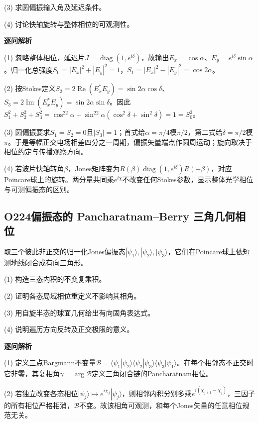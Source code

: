 (3) 求圆偏振输入角及延迟条件。

(4) 讨论快轴旋转与整体相位的可观测性。

\par\textbf{逐问解析}

(1) 忽略整体相位，延迟片$J=\operatorname{diag}(1,e^{i\delta})$，故输出$E_x=\cos\alpha$、$E_y=e^{i\delta}\sin\alpha$。归一化总强度$S_0=|E_x|^2+|E_y|^2=1$，$S_1=|E_x|^2-|E_y|^2=\cos2\alpha$。

(2) 按Stokes定义$S_2=2\operatorname{Re}(E_x^*E_y)=\sin2\alpha\cos\delta$、$S_3=2\operatorname{Im}(E_x^*E_y)=\sin2\alpha\sin\delta$。因此$S_1^2+S_2^2+S_3^2=\cos^22\alpha+\sin^22\alpha(\cos^2\delta+\sin^2\delta)=1=S_0^2$。

(3) 圆偏振要求$S_1=S_2=0$且$|S_3|=1$；首式给$\alpha=\pi/4$模$\pi/2$，第二式给$\delta=\pi/2$模$\pi$。于是等幅正交电场相差四分之一周期，偏振矢量端点作圆周运动；旋向取决于相位约定与传播观察方向。

(4) 若波片快轴转角$\beta$，Jones矩阵变为$R(\beta)\operatorname{diag}(1,e^{i\delta})R(-\beta)$，对应Poincare球上的旋转。两分量共同乘$e^{i\chi}$不改变任何Stokes参数，显示整体光学相位与可测偏振态的区别。

\par\medskip

\subsection*{O224\quad 偏振态的 Pancharatnam–Berry 三角几何相位}

取三个彼此非正交的归一化Jones偏振态$|\psi_1\rangle,|\psi_2\rangle,|\psi_3\rangle$，它们在Poincare球上依短测地线闭合成有向三角形。

(1) 构造三态内积的不变复乘积。

(2) 证明各态局域相位重定义不影响其相角。

(3) 用自旋半态的球面几何给出有向固角表达式。

(4) 说明遍历方向反转及正交极限的意义。

\par\textbf{逐问解析}

(1) 定义三点Bargmann不变量$\mathcal B=\langle\psi_1|\psi_2\rangle\langle\psi_2|\psi_3\rangle\langle\psi_3|\psi_1\rangle$。在每个相邻态不正交时它非零，其复相角$\gamma=\arg\mathcal B$定义三角闭合链的Pancharatnam相位。

(2) 若独立改变各态相位$|\psi_j\rangle\mapsto e^{i\chi_j}|\psi_j\rangle$，则相邻内积分别多乘$e^{i(\chi_{j+1}-\chi_j)}$，三因子的所有相位严格相消，$\mathcal B$不变。故该相角可观测，和每个Jones矢量的任意相位规范无关。

